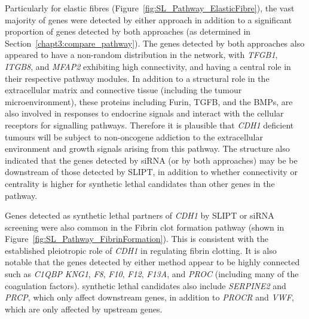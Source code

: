 Particularly for elastic fibres (Figure~\ref{fig:SL_Pathway_ElasticFibre}), the vast majority of genes were detected by either approach in addition to a significant proportion of genes detected by both approaches (as determined in Section~\ref{chapt3:compare_pathway}). The genes detected by both approaches also appeared to have a non-random distribution in the network, with \textit{TFGB1}, \textit{ITGB8}, and \textit{MFAP2} exhibiting high connectivity, and having a central role in their respective pathway modules. In addition to a structural role in the extracellular matrix and connective tissue (including the tumour microenvironment), these proteins including Furin, \gls{TGFB}, and the \glspl{BMP}, are also involved in responses to endocrine signals and interact with the cellular receptors for signalling pathways. Therefore it is plausible that \textit{CDH1} deficient tumours will be subject to \gls{non-oncogene addiction} to the extracellular environment and growth signals arising from this pathway. The  structure also indicated that the genes detected by \gls{siRNA} (or by both approaches) may be be downstream of those detected by \gls{SLIPT}, in addition to whether connectivity or \gls{centrality} is higher for \gls{synthetic lethal} candidates than other genes in the pathway.

Genes detected as \gls{synthetic lethal} partners of \textit{CDH1} by \gls{SLIPT} or \gls{siRNA} screening were also common in the Fibrin clot formation pathway (shown in Figure~\ref{fig:SL_Pathway_FibrinFormation}). This is consistent with the established pleiotropic role of \textit{CDH1} in regulating fibrin clotting. It is also notable that the genes detected by either method appear to be highly connected such as \textit{C1QBP} \textit{KNG1}, \textit{F8}, \textit{F10}, \textit{F12}, \textit{F13A}, and \textit{PROC} (including many of the coagulation factors). \Gls{synthetic lethal} candidates also include \textit{SERPINE2} and \textit{PRCP}, which only affect downstream genes, in addition to \textit{PROCR} and \textit{VWF}, which are only affected by upstream genes. 

\begin{figure*}[!tb]
  \begin{center}
   }
   \end{center}
   \caption[Synthetic lethality in Fibrin Clot Formation]{\small \textbf{Synthetic lethality in Fibrin Clot Formation.} The Reactome Fibrin Clot Formation pathway with \gls{synthetic lethal} candidates coloured as shown in the legend.
}
\label{fig:SL_Pathway_FibrinFormation}
\end{figure*}


